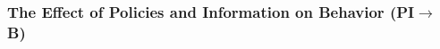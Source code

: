 \documentclass{beamer}
\renewcommand{\to}{{\rightarrow}}
\begin{document}

\begin{frame}
  \frametitle{The Effect of Policies and Information on Behavior (PI$\to$ B)}


\begin{table}
      \begin{minipage}{\linewidth}
        \centering
        \resizebox*{!}{\dimexpr\textheight-2\baselineskip\relax}{
            
          }
        \begin{flushleft}
          \scriptsize
        \end{flushleft}
      \end{minipage}
      \end{table}

\end{frame}
\end{document}
